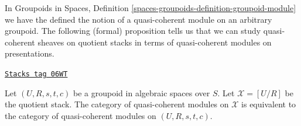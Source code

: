 In
Groupoids in Spaces, Definition
\ref{spaces-groupoids-definition-groupoid-module}
we have the defined the notion of a quasi-coherent module
on an arbitrary groupoid. The following (formal) proposition tells us
that we can study quasi-coherent sheaves on quotient stacks in
terms of quasi-coherent modules on presentations.

\begin{proposition}
\label{stacks-sheaves-proposition-quasi-coherent}
\href{https://stacks.math.columbia.edu/tag/06WT}{\texttt{Stacks tag 06WT}}

Let $(U, R, s, t, c)$ be a groupoid in algebraic spaces over $S$.
Let $\mathcal{X} = [U/R]$ be the quotient stack.
The category of quasi-coherent modules on $\mathcal{X}$
is equivalent to the category of quasi-coherent modules
on $(U, R, s, t, c)$.
\end{proposition}

